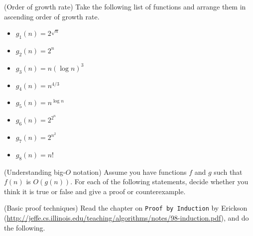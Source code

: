 \begin{questions}
\question[10] (Order of growth rate) Take the following list of functions and arrange them in
  ascending order of growth rate.
  \begin{itemize}
  \item $g_1(n) = 2^{\sqrt{n}}$
  \item $g_2(n) = 2^n$
  \item $g_3(n) = n(\log n)^3$
  \item $g_4(n) = n^{4/3}$
  \item $g_5(n) = n^{\log n}$
  \item $g_6(n) = 2^{2^n}$
  \item $g_7(n) = 2^{n^2}$
  \item $g_8(n) = n!$
  \end{itemize}

\question[15] (Understanding big-$O$ notation) Assume you have functions $f$ and $g$ such that $f(n)$ is
  $O(g(n))$. For each of the following statements, decide whether you
  think it is true or false and give a proof or counterexample.
\question (Basic proof techniques) Read the chapter on \texttt{Proof
    by Induction} by Erickson
  (\url{http://jeffe.cs.illinois.edu/teaching/algorithms/notes/98-induction.pdf}),
  and do the following.

\end{questions}
